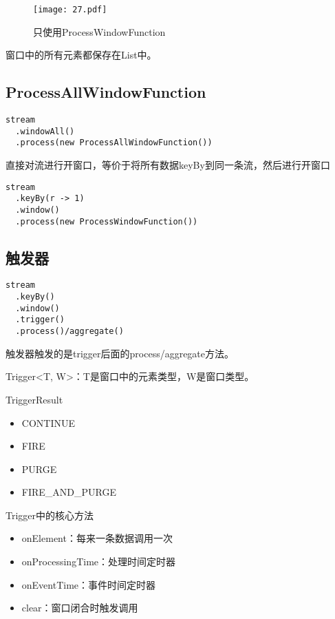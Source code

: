 \documentclass[cn,11pt,chinese]{elegantbook}
\begin{document}
\clearpage
\begin{figure}[htbp]
  \centering
  \texttt{[image: 27.pdf]}
  \caption{只使用ProcessWindowFunction}
\end{figure}

窗口中的所有元素都保存在List中。

\subsection{ProcessAllWindowFunction}

\begin{lstlisting}
stream
  .windowAll()
  .process(new ProcessAllWindowFunction())
\end{lstlisting}

直接对流进行开窗口，等价于将所有数据keyBy到同一条流，然后进行开窗口

\begin{lstlisting}
stream
  .keyBy(r -> 1)
  .window()
  .process(new ProcessWindowFunction())
\end{lstlisting}

\subsection{触发器}

\begin{lstlisting}
stream
  .keyBy()
  .window()
  .trigger()
  .process()/aggregate()
\end{lstlisting}

触发器触发的是trigger后面的process/aggregate方法。

Trigger<T, W>：T是窗口中的元素类型，W是窗口类型。

TriggerResult

\begin{itemize}
  \item CONTINUE
  \item FIRE
  \item PURGE
  \item FIRE\_AND\_PURGE
\end{itemize}

Trigger中的核心方法

\begin{itemize}
  \item onElement：每来一条数据调用一次
  \item onProcessingTime：处理时间定时器
  \item onEventTime：事件时间定时器
  \item clear：窗口闭合时触发调用
\end{itemize}
\end{document}
